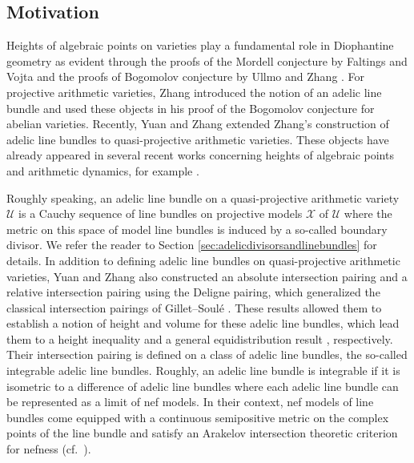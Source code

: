 \documentclass[11pt,reqno]{amsart}
\newcommand{\cX}{\mathcal{X}}
\newcommand{\cU}{\mathcal{U}}
\theoremstyle{theorem}
\numberwithin{equation}{subsection}
\numberwithin{equation}{subsection}
\theoremstyle{definition}
\theoremstyle{remark}
\numberwithin{equation}{subsubsection} \numberwithin{figure}{section}
\begin{document}
\subsection*{Motivation}
Heights of algebraic points on varieties play a fundamental role in Diophantine geometry as evident through the proofs of the Mordell conjecture by Faltings \cite{Faltings2} and Vojta  \cite{Vojta:Mordell} and the proofs of Bogomolov conjecture by Ullmo \cite{Ullmo:PositivityPoints} and Zhang \cite{Zhang:EquidistributionSmallPoints}.
For projective arithmetic varieties, Zhang \cite{Zhang:SmallPoints} introduced the notion of an adelic line bundle and used these objects in his proof of the Bogomolov conjecture for abelian varieties. 
Recently, Yuan and Zhang \cite{YuanZhang:AdelicLineBundles} extended Zhang's construction of adelic line bundles to quasi-projective arithmetic varieties. 
These objects have already appeared in several recent works concerning heights of algebraic points and arithmetic dynamics, for example \cite{Yuan:ArithmeticBignessUniformBogomolov, GaoZhang:HeightsPeriodsAlgebraicCyclesFamiles, DemarcoMavraki:DynamicsP1, DemarcoMavraki:GeometryPreperiodicPointsFamilies, MavrakiSchmidt:DynamicalBogomolovFamiliesSplitRational,  JiXie:DAOCurves, Abbound:UnlikelyIntersections}. 

Roughly speaking, an adelic line bundle on a quasi-projective arithmetic variety $\cU$ is a Cauchy sequence of line bundles on projective models $\cX$ of $\cU$ where the metric on this space of model line bundles is induced by a so-called boundary divisor. 
We refer the reader to Section \ref{sec:adelicdivisorsandlinebundles} for details. 
In addition to defining adelic line bundles on quasi-projective arithmetic varieties, Yuan and Zhang \cite[Section 4]{YuanZhang:AdelicLineBundles} also constructed an absolute intersection pairing and a relative intersection pairing using the Deligne pairing, which generalized the classical intersection pairings of Gillet--Soul\'e \cite{GilletSoule:ArithmeticIntersectionTheory, GilletSoule:ArithmeticRiemannRoch}. These results allowed them to establish a notion of height and volume for these adelic line bundles, which lead them to a height inequality and a general equidistribution result \cite[Theorem 5.3.5 \& Theorem 5.4.3]{YuanZhang:AdelicLineBundles}, respectively.  
Their intersection pairing is defined on a class of adelic line bundles, the so-called integrable adelic line bundles. 
Roughly, an adelic line bundle is integrable if it is isometric to a difference of adelic line bundles where each adelic line bundle can be represented as a limit of nef models. 
In their context, nef models of line bundles come equipped with a continuous semipositive metric on the complex points of the line bundle and satisfy an Arakelov intersection theoretic criterion for nefness (cf.~\cite[Appendix A.4]{YuanZhang:AdelicLineBundles}). 
\end{document}
